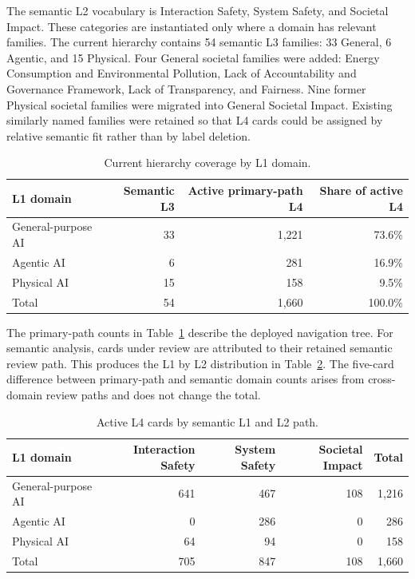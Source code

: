 \documentclass[11pt,a4paper]{article}
\begin{document}
The semantic L2 vocabulary is Interaction Safety, System Safety, and Societal
Impact. These categories are instantiated only where a domain has relevant
families. The current hierarchy contains 54 semantic L3 families: 33 General,
6 Agentic, and 15 Physical. Four General societal families were added:
Energy Consumption and Environmental Pollution, Lack of Accountability and
Governance Framework, Lack of Transparency, and Fairness. Nine former Physical
societal families were migrated into General Societal Impact. Existing
similarly named families were retained so that L4 cards could be assigned by
relative semantic fit rather than by label deletion.

\begin{table}[H]
\centering
\caption{Current hierarchy coverage by L1 domain.}
\label{tab:l1}
\begin{tabular}{lrrr}
\toprule
L1 domain & Semantic L3 & Active primary-path L4 & Share of active L4 \\
\midrule
General-purpose AI & 33 & 1,221 & 73.6\% \\
Agentic AI & 6 & 281 & 16.9\% \\
Physical AI & 15 & 158 & 9.5\% \\
\midrule
Total & 54 & 1,660 & 100.0\% \\
\bottomrule
\end{tabular}
\end{table}

The primary-path counts in Table~\ref{tab:l1} describe the deployed navigation
tree. For semantic analysis, cards under review are attributed to their
retained semantic review path. This produces the L1 by L2 distribution in
Table~\ref{tab:l2}. The five-card difference between primary-path and semantic
domain counts arises from cross-domain review paths and does not change the
total.

\begin{table}[H]
\centering
\caption{Active L4 cards by semantic L1 and L2 path.}
\label{tab:l2}
\begin{tabular}{lrrrr}
\toprule
L1 domain & Interaction Safety & System Safety & Societal Impact & Total \\
\midrule
General-purpose AI & 641 & 467 & 108 & 1,216 \\
Agentic AI & 0 & 286 & 0 & 286 \\
Physical AI & 64 & 94 & 0 & 158 \\
\midrule
Total & 705 & 847 & 108 & 1,660 \\
\bottomrule
\end{tabular}
\end{table}
\end{document}
